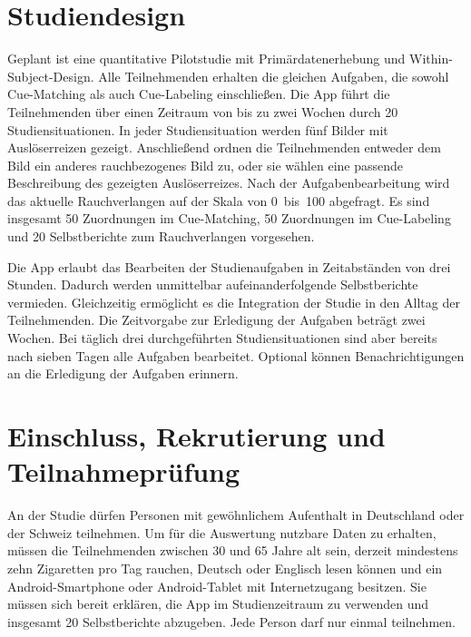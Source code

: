 \section{Studiendesign}
Geplant ist eine quantitative Pilotstudie mit Primärdatenerhebung und Within-Subject-Design. Alle Teilnehmenden erhalten die gleichen Aufgaben, die sowohl Cue-Matching als auch Cue-Labeling einschließen. Die App führt die Teilnehmenden über einen Zeitraum von bis zu zwei Wochen durch 20 Studiensituationen. In jeder Studiensituation werden fünf Bilder mit Auslöserreizen gezeigt. Anschließend ordnen die Teilnehmenden entweder dem Bild ein anderes rauchbezogenes Bild zu, oder sie wählen eine passende Beschreibung des gezeigten Auslöserreizes. Nach der Aufgabenbearbeitung wird das aktuelle Rauchverlangen auf der Skala von 0~bis~100 abgefragt. Es sind insgesamt 50 Zuordnungen im Cue-Matching, 50 Zuordnungen im Cue-Labeling und 20 Selbstberichte zum Rauchverlangen vorgesehen.

Die App erlaubt das Bearbeiten der Studienaufgaben in Zeitabständen von drei Stunden. Dadurch werden unmittelbar aufeinanderfolgende Selbstberichte vermieden. Gleichzeitig ermöglicht es die Integration der Studie in den Alltag der Teilnehmenden. Die Zeitvorgabe zur Erledigung der Aufgaben beträgt zwei Wochen. Bei täglich drei durchgeführten Studiensituationen sind aber bereits nach sieben Tagen alle Aufgaben bearbeitet. Optional können Benachrichtigungen an die Erledigung der Aufgaben erinnern.

\section{Einschluss, Rekrutierung und Teilnahmeprüfung}

An der Studie dürfen Personen mit gewöhnlichem Aufenthalt in Deutschland oder der Schweiz teilnehmen. Um für die Auswertung nutzbare Daten zu erhalten, müssen die Teilnehmenden zwischen 30 und 65 Jahre alt sein, derzeit mindestens zehn Zigaretten pro Tag rauchen, Deutsch oder Englisch lesen können und ein Android-Smartphone oder Android-Tablet mit Internetzugang besitzen. Sie müssen sich bereit erklären, die App im Studienzeitraum zu verwenden und insgesamt 20 Selbstberichte abzugeben. Jede Person darf nur einmal teilnehmen.


